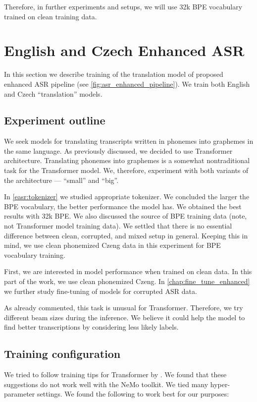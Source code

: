 Therefore, in further experiments and setups, we will use 32k BPE vocabulary trained on clean training data.









\section{English and Czech Enhanced ASR}
\label{easr:english}
In this section we describe training of the translation model of proposed enhanced ASR pipeline (see \cref{fig:asr_enhanced_pipeline}). We train both English and Czech ``translation'' models.

\subsection{Experiment outline}
\label{easr:outline}
We seek models for translating transcripts written in phonemes into graphemes in the same language. As previously discussed, we decided to use Transformer architecture. Translating phonemes into graphemes is a somewhat nontraditional task for the Transformer model. We, therefore, experiment with both variants of the architecture --- ``small'' and ``big''. 

In \cref{easr:tokenizer} we studied appropriate tokenizer. We concluded the larger the BPE vocabulary, the better performance the model has. We obtained the best results with 32k BPE. We also discussed the source of BPE training data (note, not Transformer model training data). We settled that there is no essential difference between clean, corrupted, and mixed setup in general. Keeping this in mind, we use clean phonemized Czeng data in this experiment for BPE vocabulary training. 

First, we are interested in model performance when trained on clean data. In this part of the work, we use clean phonemized Czeng. In \cref{chap:fine_tune_enhanced} we further study fine-tuning of models for corrupted ASR data.

As already commented, this task is unusual for Transformer. Therefore, we try different beam sizes during the inference. We believe it could help the model to find better transcriptions by considering less likely labels.

\subsection{Training configuration}
We tried to follow training tips for Transformer by . We found that these suggestions do not work well with the NeMo toolkit. We tied many hyper-parameter settings. We found the following to work best for our purposes:

